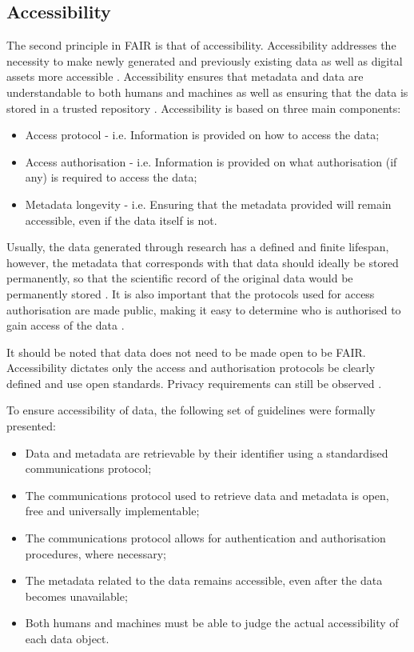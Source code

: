 \documentclass{cisfyp}
\begin{document}
\subsection{Accessibility}
The second principle in FAIR is that of accessibility. Accessibility addresses the necessity to make newly generated and previously existing data as well as digital assets more accessible \cite{Wise2019}. Accessibility ensures that metadata and data are understandable to both humans and machines as well as ensuring that the data is stored in a trusted repository \cite{libereurope_2017}.
Accessibility is based on three main components: \cite{Wise2019}
\begin{itemize}
	\item Access protocol - i.e. Information is provided on how to access the data; \item Access authorisation - i.e. Information is provided on what authorisation (if any) is required to access the data; \item Metadata longevity - i.e. Ensuring that the metadata provided will remain accessible, even if the data itself is not.
\end{itemize}
Usually, the data generated through research has a defined and finite lifespan, however, the metadata that corresponds with that data should ideally be stored permanently, so that the scientific record of the original data would be permanently stored \cite{Wise2019}. It is also important that the protocols used for access authorisation are made public, making it easy to determine who is authorised to gain access of the data \cite{Wise2019}.

It should be noted that data does not need to be made open to be FAIR. Accessibility dictates only the access and authorisation protocols be clearly defined and use open standards. Privacy requirements can still be observed \cite{Wise2019}.

To ensure accessibility of data, the following set of guidelines were formally presented: \cite{Wilkinson2016}
\begin{itemize}
	\item Data and metadata are retrievable by their identifier using a standardised communications protocol;
	\item The communications protocol used to retrieve data and metadata is open, free and universally implementable;
	\item The communications protocol allows for authentication and authorisation procedures, where necessary;
	\item The metadata related to the data remains accessible, even after the data becomes unavailable;
	\item Both humans and machines must be able to judge the actual accessibility of each data object.
\end{itemize}
\end{document}
